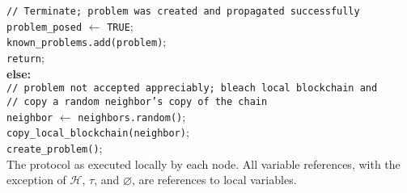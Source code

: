 \documentclass{article}
\begin{document}
\begin{algorithm}[H]
		\hspace{20mm}\texttt{// Terminate; problem was created and propagated successfully} \\
		\hspace{20mm}\texttt{problem\_posed} $\gets$ \texttt{TRUE}; \\
		\hspace{20mm}\texttt{known\_problems.add(problem)}; \\
		\hspace{20mm}\texttt{return}; \\
		\hspace{15mm}\textbf{else:} \\
		\hspace{20mm}\texttt{// problem not accepted appreciably; bleach local blockchain and} \\
		\hspace{20mm}\texttt{// copy a random neighbor's copy of the chain} \\
		\hspace{20mm}\texttt{neighbor} $\gets$ \texttt{neighbors.random()}; \\
		\hspace{20mm}\texttt{copy\_local\_blockchain(neighbor)}; \\
		\hspace{20mm}\texttt{create\_problem()}; \\
		
	\caption{The protocol as executed locally by each node. All variable references,
		with the exception of $\mathcal{H}$, $\tau$, and $\varnothing$, are
		references to local variables.}
\end{algorithm}
\end{document}
